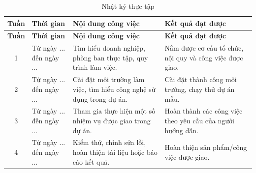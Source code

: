 \begin{longtable}{|c|p{3cm}|p{6cm}|p{4cm}|}
\caption{Nhật ký thực tập}
\label{tab:nhat-ky-thuc-tap} \\
\hline
\textbf{Tuần} & \textbf{Thời gian} & \textbf{Nội dung công việc} & \textbf{Kết quả đạt được} \\
\hline
\endfirsthead

\hline
\textbf{Tuần} & \textbf{Thời gian} & \textbf{Nội dung công việc} & \textbf{Kết quả đạt được} \\
\hline
\endhead

1 & Từ ngày ... đến ngày ...
& Tìm hiểu doanh nghiệp, phòng ban thực tập, quy trình làm việc.
& Nắm được cơ cấu tổ chức, nội quy và công việc được giao. \\
\hline

2 & Từ ngày ... đến ngày ...
& Cài đặt môi trường làm việc, tìm hiểu công nghệ sử dụng trong dự án.
& Cài đặt thành công môi trường, chạy thử dự án mẫu. \\
\hline

3 & Từ ngày ... đến ngày ...
& Tham gia thực hiện một số nhiệm vụ được giao trong dự án.
& Hoàn thành các công việc theo yêu cầu của người hướng dẫn. \\
\hline

4 & Từ ngày ... đến ngày ...
& Kiểm thử, chỉnh sửa lỗi, hoàn thiện tài liệu hoặc báo cáo kết quả.
& Hoàn thiện sản phẩm/công việc được giao. \\
\hline

\end{longtable}
